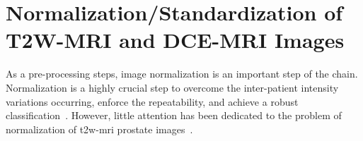\chapter{Normalization/Standardization of T2W-MRI and DCE-MRI Images} \label{chap:5}

As a pre-processing steps, image normalization is an important step of the chain.
Normalization is a highly crucial step to overcome the inter-patient intensity variations occurring, enforce the repeatability, and achieve a robust classification~\cite{Lemaitre2015}.
However, little attention has been dedicated to the problem of normalization of \ac{t2w}-\ac{mri} prostate images~\cite{Lemaitre2015}.






